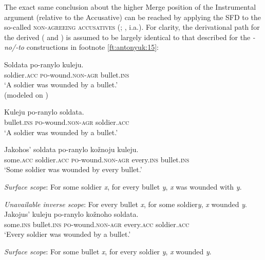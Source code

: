 \documentclass[output=paper,colorlinks,citecolor=brown]{langscibook}
\begin{document}

The exact same conclusion about the higher Merge position of the Instrumental argument (relative to the Accusative) can be reached by applying the SFD to the so-called \textsc{non-agreeing accusatives} (\citealt{LavineFreidin2002}; \citealt{Lavine2022,Lavine2023}, i.a.). For clarity, the derivational path for the derived ( and ) is assumed to be largely identical to that described for the \textit{{}-no/-to} constructions in footnote \ref{ft:antonyuk:15}:

\ea%
    \label{ex:antonyuk:25}
\ea \label{ex:antonyuk:25a}
\gll   Soldata   po-ranylo     kuleju.           \\
  soldier.\textsc{acc}  \textsc{po}-wound.\textsc{non-agr}   bullet.\textsc{ins}\\
\glt `A soldier was wounded by a bullet.’\\
\hfill (modeled on \citealt{LavineFreidin2002})

\ex
\gll   Kuleju     po-ranylo     soldata.\\
  bullet.\textsc{ins}  \textsc{po}-wound.\textsc{non-agr}  soldier.\textsc{acc}\\
\glt `A soldier was wounded by a bullet.’
    \z
\z

\ea%
    \label{ex:antonyuk:26}
\ea \label{ex:antonyuk:26a}
\gll   Jakohos’ soldata   po-ranylo     kožnoju kuleju.    \\
  some.\textsc{acc} soldier.\textsc{acc}  \textsc{po}-wound.\textsc{non-agr}  every.\textsc{ins} bullet.\textsc{ins}\\
\glt `Some soldier was wounded by every bullet.’

\textit{Surface scope}: For some soldier \textit{x}, for every bullet \textit{y}, \textit{x} was wounded with \textit{y}.

\textit{Unavailable inverse scope}: For every bullet \textit{x}, for some soldier\textit{y}, \textit{x} wounded \textit{y}.
\ex
\gll   Jakojus’ kuleju   po-ranylo     kožnoho soldata.\\
  some.\textsc{ins} bullet.\textsc{ins}  \textsc{po}-wound.\textsc{non-agr}  every.\textsc{acc} soldier.\textsc{acc}\\
\glt `Every soldier was wounded by a bullet.’

\textit{Surface scope}: For some bullet \textit{x}, for every soldier \textit{y}, \textit{x} wounded \textit{y}.
\end{document}
